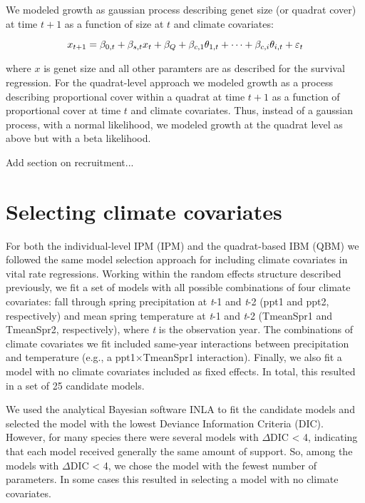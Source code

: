 \documentclass[12pt]{article}
\begin{document}
We modeled growth as gaussian process describing genet size (or quadrat cover) at time $t+1$ as a function of size at $t$ and climate covariates:

\[ 
x_{t+1} = \beta_{0,t} + \beta_{s,t}x_{t} + \beta_{Q} + \beta_{c,1}\theta_{1,t}\\
+ \cdots +  \beta_{c,i}\theta_{i,t} + \varepsilon_{t}
\]

\noindent where $x$ is genet size and all other paramters are as described for the survival regression. For the quadrat-level approach we modeled growth as a process describing proportional cover within a quadrat at time $t+1$ as a function of proportional cover at time $t$ and climate covariates. Thus, instead of a gaussian process, with a normal likelihood, we modeled growth at the quadrat level as above but with a beta likelihood.  

Add section on recruitment...

\section{Selecting climate covariates}
For both the individual-level IPM (IPM) and the quadrat-based IBM (QBM) we followed the same model selection approach for including climate covariates in vital rate regressions.  Working within the random effects structure described previously, we fit a set of models with all possible combinations of four climate covariates: fall through spring precipitation at \emph{t}-1 and \emph{t}-2 (ppt1 and ppt2, respectively) and mean spring temperature at \emph{t}-1 and \emph{t}-2 (TmeanSpr1 and TmeanSpr2, respectively), where \emph{t} is the observation year. The combinations of climate covariates we fit included same-year interactions between precipitation and temperature (e.g., a ppt1$\times$TmeanSpr1 interaction). Finally, we also fit a model with no climate covariates included as fixed effects. In total, this resulted in a set of 25 candidate models.

We used the analytical Bayesian software INLA to fit the candidate models and selected the model with the lowest Deviance Information Criteria (DIC). However, for many species there were several models with $\Delta$DIC < 4, indicating that each model received generally the same amount of support. So, among the models with $\Delta$DIC < 4, we chose the model with the fewest number of parameters. In some cases this resulted in selecting a model with no climate covariates.
\end{document}
